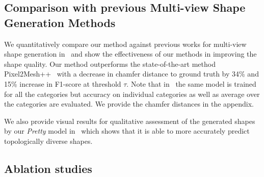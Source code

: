 \subsection{Comparison with previous Multi-view Shape Generation Methods}
We quantitatively compare our method against previous works for multi-view shape generation in~ and show the effectiveness of our methods in improving the shape quality. Our method outperforms the state-of-the-art method  Pixel2Mesh++~\cite{wen2019pixel2mesh++} with
a decrease in chamfer distance to ground truth by 34\% and 15\% increase in F1-score at threshold $\tau$.
Note that in~ the same model is trained for all the categories but accuracy on individual categories as well as average over the categories are evaluated.
We provide the chamfer distances in the appendix.

\vspace{-2mm}
We also provide visual results for qualitative assessment of the generated shapes by our \emph{Pretty} model in~ which shows that it is able to more accurately predict topologically diverse shapes.

\vspace{-2mm}
\subsection{Ablation studies}
\vspace{-2mm}
